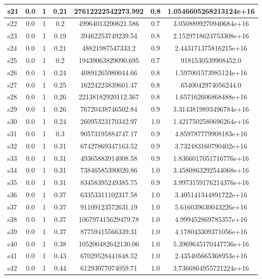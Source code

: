 \documentclass{article}
\begin{document}
\begin{tabular}{|l|c|c|c|c|c|c|}
\hline
s21 &0.0 & 1 & 0.21 & 27612222542273.992 & 0.8 & 1.0546605268213124e+16\\
\hline
s22 &0.0 & 1 & 0.2 & 49964013290621.586 & 0.7 & 3.0508899270940684e+16\\
\hline
s23 &0.0 & 1 & 0.19 & 39462253749239.54 & 0.8 & 2.1529718624753308e+16\\
\hline
s24 &0.0 & 1 & 0.21 & 48821987547333.2 & 0.9 & 2.443171375816215e+16\\
\hline
s25 &0.0 & 1 & 0.2 & 19439063829090.695 & 0.7 & 9181530539908452.0\\
\hline
s26 &0.0 & 1 & 0.24 & 40891265980044.66 & 0.8 & 1.597001573985124e+16\\
\hline
s27 &0.0 & 1 & 0.25 & 16224223839601.47 & 0.8 & 6540042974056244.0\\
\hline
s28 &0.0 & 1 & 0.26 & 22138182920112.367 & 0.8 & 1.657162606868488e+16\\
\hline
s29 &0.0 & 1 & 0.26 & 76720438746502.84 & 0.9 & 3.3143819893496784e+16\\
\hline
s30 &0.0 & 1 & 0.24 & 26095323170342.97 & 1.0 & 1.4217502580696264e+16\\
\hline
s31 &0.0 & 1 & 0.3 & 90573195884747.17 & 0.9 & 4.859787779908183e+16\\
\hline
s32 &0.0 & 1 & 0.31 & 67427869347163.52 & 0.9 & 3.732483160790402e+16\\
\hline
s33 &0.0 & 1 & 0.31 & 49365883914008.58 & 0.9 & 1.8366017051716776e+16\\
\hline
s34 &0.0 & 1 & 0.31 & 73846585390020.86 & 1.0 & 3.4580863292544068e+16\\
\hline
s35 &0.0 & 1 & 0.31 & 83458395249385.75 & 0.9 & 3.9973159176214376e+16\\
\hline
s36 &0.0 & 1 & 0.37 & 63353311102317.58 & 1.0 & 3.405141344891722e+16\\
\hline
s37 &0.0 & 1 & 0.37 & 91109123572631.19 & 1.0 & 5.616039630043226e+16\\
\hline
s38 &0.0 & 1 & 0.37 & 106797415629479.78 & 1.0 & 4.999452869785357e+16\\
\hline
s39 &0.0 & 1 & 0.37 & 87759415566339.31 & 1.0 & 4.178043309371056e+16\\
\hline
s40 &0.0 & 1 & 0.38 & 105200482642130.06 & 1.0 & 5.3969645170447736e+16\\
\hline
s41 &0.0 & 1 & 0.43 & 67029528441648.52 & 1.0 & 2.435405665368953e+16\\
\hline
s42 &0.0 & 1 & 0.44 & 61293077074059.71 & 1.0 & 3.7366864955721224e+16\\

\end{tabular}
\end{document}

